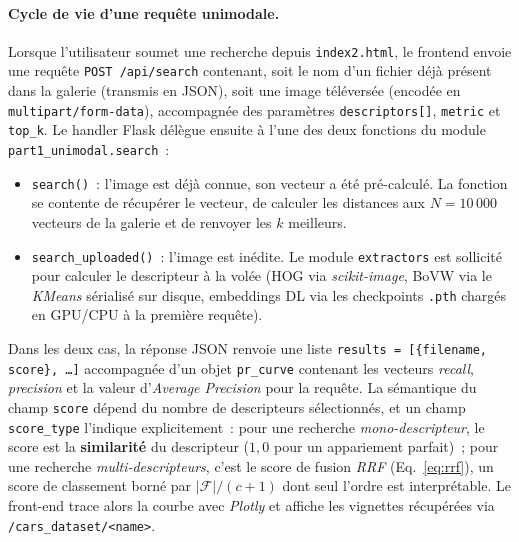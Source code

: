 \documentclass[a4paper,11pt]{article}
\begin{document}
\paragraph{Cycle de vie d'une requête unimodale.}
Lorsque l'utilisateur soumet une recherche depuis \texttt{index2.html},
le frontend envoie une requête \texttt{POST /api/search} contenant, soit
le nom d'un fichier déjà présent dans la galerie (transmis en JSON),
soit une image téléversée (encodée en \texttt{multipart/form-data}),
accompagnée des paramètres \texttt{descriptors[]}, \texttt{metric} et
\texttt{top\_k}. Le handler Flask délègue ensuite à l'une des deux
fonctions du module \texttt{part1\_unimodal.search}~:
\begin{itemize}
    \item \texttt{search()}~: l'image est déjà connue, son vecteur a été
    pré-calculé. La fonction se contente de récupérer le vecteur, de
    calculer les distances aux $N=10\,000$ vecteurs de la galerie et de
    renvoyer les $k$ meilleurs.
    \item \texttt{search\_uploaded()}~: l'image est inédite. Le module
    \texttt{extractors} est sollicité pour calculer le descripteur à la
    volée (HOG via \textit{scikit-image}, BoVW via le \textit{KMeans}
    sérialisé sur disque, embeddings DL via les checkpoints \texttt{.pth}
    chargés en GPU/CPU à la première requête).
\end{itemize}
Dans les deux cas, la réponse JSON renvoie une liste
\texttt{results = [\{filename, score\}, \dots]} accompagnée d'un objet
\texttt{pr\_curve} contenant les vecteurs \emph{recall}, \emph{precision}
et la valeur d'\textit{Average Precision} pour la requête. La sémantique
du champ \texttt{score} dépend du nombre de descripteurs sélectionnés,
et un champ \texttt{score\_type} l'indique explicitement~: pour une
recherche \emph{mono-descripteur}, le score est la \textbf{similarité}
du descripteur ($1{,}0$ pour un appariement parfait)~; pour une
recherche \emph{multi-descripteurs}, c'est le score de fusion
\textit{RRF} (Eq.~\eqref{eq:rrf}), un score de classement borné par
$|\mathcal{F}|/(c+1)$ dont seul l'ordre est interprétable. Le front-end
trace alors la courbe avec \textit{Plotly} et affiche les vignettes
récupérées via \texttt{/cars\_dataset/<name>}.
\end{document}
